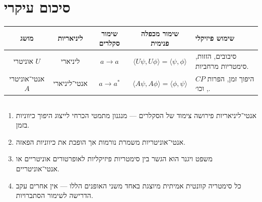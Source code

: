\section*{סיכום עיקרי}

\begin{center}
\begin{tabular}{|c|c|c|c|p{5cm}|}
\hline
\textbf{מושג} & \textbf{ליניאריות} & \textbf{שימור סקלרים} & \textbf{שימור מכפלה פנימית} & \textbf{שימוש פיזיקלי} \\
\hline
אוניטרי $U$ & ליניארי & $a \to a$ &
$\langle U\psi, U\phi \rangle = \langle \psi, \phi \rangle$ &
סיבובים, הזזות, סימטריות מרחביות. \\
\hline
אנטי־אוניטרי $A$ & אנטי־ליניארי & $a \to a^*$ &
$\langle A\psi, A\phi \rangle = \langle \phi, \psi \rangle$ &
היפוך זמן, הפרות $CP$, וכו׳. \\
\hline
\end{tabular}
\end{center}

\subsection*{}

\begin{enumerate}
    \item אנטי־ליניאריות פירושה צימוד של הסקלרים — מנגנון מתמטי הכרחי לייצוג היפוך כיווניות בזמן.
    \item אנטי־אוניטריות משמרת נורמות אך הופכת את כיווניות הפאזה.
    \item משפט ויגנר הוא הגשר בין סימטריות פיזיקליות לאופרטורים אוניטריים או אנטי־אוניטריים.
    \item כל סימטריה קוונטית אמיתית מיוצגת באחד משני האופנים הללו — אין אחרים עקב הדרישה לשימור הסתברויות.
\end{enumerate}
